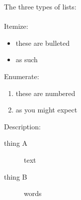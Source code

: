 \documentclass{article}
\begin{document}
The three types of lists:\\\\
Itemize:
\begin{itemize}
  \item these are bulleted
  \item as such
\end{itemize}
Enumerate:
\begin{enumerate}
  \item these are numbered
  \item as you might expect
\end{enumerate}
Description:
\begin{description}
  \item[thing A] text 
  \item[thing B] words 
\end{description}
\end{document}
